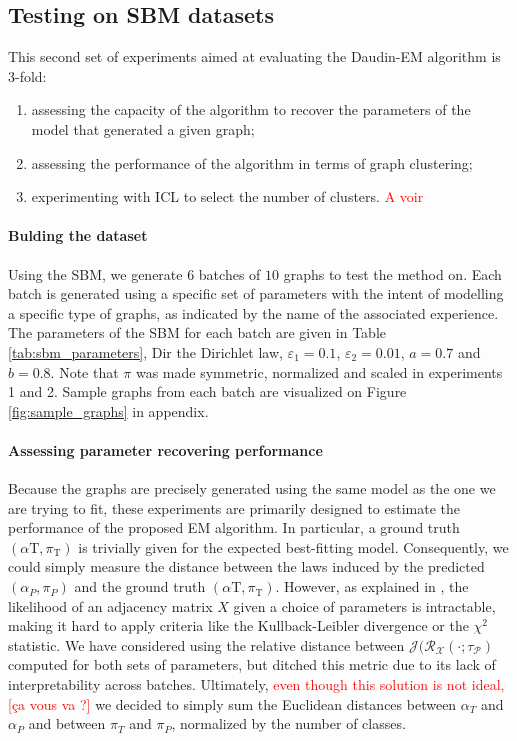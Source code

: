 \documentclass[switch, 12pt]{article}
\begin{document}
\begin{multicols}{2}
    \subsection{Testing on SBM datasets}

    This second set of experiments aimed at evaluating the Daudin-EM algorithm is 3-fold:
    \begin{enumerate}
        \item assessing the capacity of the algorithm to recover the parameters of the model that generated a given graph;
        \item assessing the performance of the algorithm in terms of graph clustering;
        \item experimenting with ICL to select the number of clusters. \textcolor{red}{A voir}
    \end{enumerate}


    \paragraph{Bulding the dataset} Using the SBM, we generate 6 batches of $10$ graphs to test the method on. Each batch is generated using a specific set of parameters with the intent of modelling a specific type of graphs, as indicated by the name of the associated experience. The parameters of the SBM for each batch are given in Table \ref{tab:sbm_parameters}, $\mathrm{Dir}$ the Dirichlet law, $\varepsilon_1 = 0.1$, $\varepsilon_2 = 0.01$, $a = 0.7$ and $b = 0.8$. Note that $\pi$ was made symmetric, normalized and scaled in experiments 1 and 2. Sample graphs from each batch are visualized on Figure \ref{fig:sample_graphs} in appendix.

    \paragraph{Assessing parameter recovering performance} Because the graphs are precisely generated using the same model as the one we are trying to fit, these experiments are primarily designed to estimate the performance of the proposed EM algorithm. In particular, a ground truth $(\alpha{\mathrm{T}}, \pi_{\mathrm{T}})$ is trivially given for the expected best-fitting model. Consequently, we could simply measure the distance between the laws induced by the predicted $(\alpha_P, \pi_P)$ and the ground truth $(\alpha{\mathrm{T}}, \pi_{\mathrm{T}})$. However, as explained in \cite{main_article}, the likelihood of an adjacency matrix $X$ given a choice of parameters is intractable, making it hard to apply criteria like the Kullback-Leibler divergence or the $\chi^2$ statistic. We have considered using the relative distance between $\mathcal{J(R_X(\cdot; \tau_P)}$ computed for both sets of parameters, but ditched this metric due to its lack of interpretability across batches. Ultimately, \textcolor{red}{even though this solution is not ideal, [ça vous va ?]} we decided to simply sum the Euclidean distances between $\alpha_T$ and $\alpha_P$ and between $\pi_T$ and $\pi_P$, normalized by the number of classes.


\end{multicols}
\end{document}
